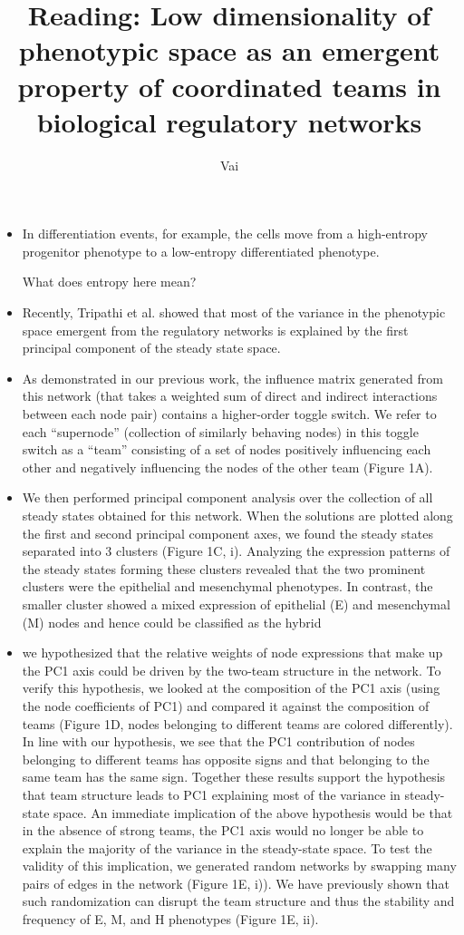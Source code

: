 \documentclass{article}
\title{Reading: Low dimensionality of phenotypic space as an emergent property
of coordinated teams in biological regulatory networks
}
\author{Vai}
\begin{document}
\maketitle 
\begin{itemize}

\item  In differentiation events, for example, the cells move from a high-entropy
progenitor phenotype to a low-entropy differentiated phenotype. 

What does entropy here mean?
\item Recently,
Tripathi et al. showed that most of the variance in the phenotypic space emergent from the regulatory
networks is explained by the first principal component of the steady state space.

\item As demonstrated
in our previous work, the influence matrix generated from this network (that takes a weighted sum
of direct and indirect interactions between each node pair) contains a higher-order toggle switch. We
refer to each “supernode” (collection of similarly behaving nodes) in this toggle switch as a “team”
consisting of a set of nodes positively influencing each other and negatively influencing the nodes of
the other team (Figure 1A).

\item We then performed principal component analysis over the collection of all steady states obtained
for this network. When the solutions are plotted along the first and second principal component axes,
we found the steady states separated into 3 clusters (Figure 1C, i). Analyzing the expression patterns
of the steady states forming these clusters revealed that the two prominent clusters were the
epithelial and mesenchymal phenotypes. In contrast, the smaller cluster showed a mixed expression
of epithelial (E) and mesenchymal (M) nodes and hence could be classified as the hybrid

\item we hypothesized that the relative weights of node
expressions that make up the PC1 axis could be driven by the two-team structure in the network. To
verify this hypothesis, we looked at the composition of the PC1 axis (using the node coefficients of
PC1) and compared it against the composition of teams (Figure 1D, nodes belonging to different
teams are colored differently). In line with our hypothesis, we see that the PC1 contribution of nodes
belonging to different teams has opposite signs and that belonging to the same team has the same
sign. Together these results support the hypothesis that team structure leads to PC1 explaining most
of the variance in steady-state space.
An immediate implication of the above hypothesis would be that in the absence of strong teams,
the PC1 axis would no longer be able to explain the majority of the variance in the steady-state space.
To test the validity of this implication, we generated random networks by swapping many pairs of
edges in the network (Figure 1E, i)). We have previously shown that such randomization can disrupt
the team structure and thus the stability and frequency of E, M, and H phenotypes (Figure 1E, ii). 


\end{itemize}
\end{document}
